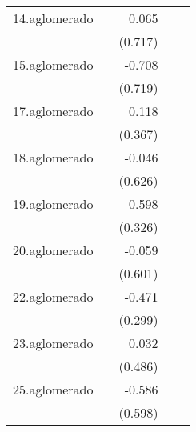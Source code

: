 {\begin{longtable}{l*{4}{D{.}{.}{-1}}}
\addlinespace
14.aglomerado&                     &       0.065         &                     &                     \\
            &                     &     (0.717)         &                     &                     \\
\addlinespace
15.aglomerado&                     &      -0.708         &                     &                     \\
            &                     &     (0.719)         &                     &                     \\
\addlinespace
17.aglomerado&                     &       0.118         &                     &                     \\
            &                     &     (0.367)         &                     &                     \\
\addlinespace
18.aglomerado&                     &      -0.046         &                     &                     \\
            &                     &     (0.626)         &                     &                     \\
\addlinespace
19.aglomerado&                     &      -0.598         &                     &                     \\
            &                     &     (0.326)         &                     &                     \\
\addlinespace
20.aglomerado&                     &      -0.059         &                     &                     \\
            &                     &     (0.601)         &                     &                     \\
\addlinespace
22.aglomerado&                     &      -0.471         &                     &                     \\
            &                     &     (0.299)         &                     &                     \\
\addlinespace
23.aglomerado&                     &       0.032         &                     &                     \\
            &                     &     (0.486)         &                     &                     \\
\addlinespace
25.aglomerado&                     &      -0.586         &                     &                     \\
            &                     &     (0.598)         &                     &                     \\

\end{longtable}}
